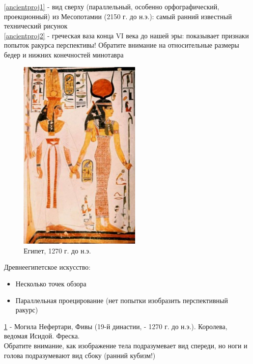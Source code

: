 \documentclass[a4paper, 14pt]{extarticle}
\begin{document}
\ref{ancientproj1} - вид сверху (параллельный, особенно орфографический, проекционный) из Месопотамии (2150 г. до н.э.): самый ранний известный технический рисунок\\
\ref{ancientproj2} - греческая ваза конца VI века до нашей эры: показывает признаки попыток ракурса перспективы! Обратите внимание на относительные размеры бедер и нижних конечностей минотавра
\begin{figure}[h]
	\centering
	\includegraphics[width=6cm]{l5/S003.jpg}
	\caption{Египет, 1270 г. до н.э.}
	\label{ancientproj3}
\end{figure}
Древнеегипетское искусство:
\begin{itemize}
	\item Несколько точек обзора
	\item Параллельная проецирование (нет попытки изобразить перспективный ракурс)
\end{itemize}

\ref{ancientproj3} - Могила Нефертари, Фивы (19-й династии, - 1270 г. до н.э.). Королева, ведомая Исидой. Фреска.\\
Обратите внимание, как изображение тела подразумевает вид спереди, но ноги и голова подразумевают вид сбоку (ранний кубизм!)
\end{document}
